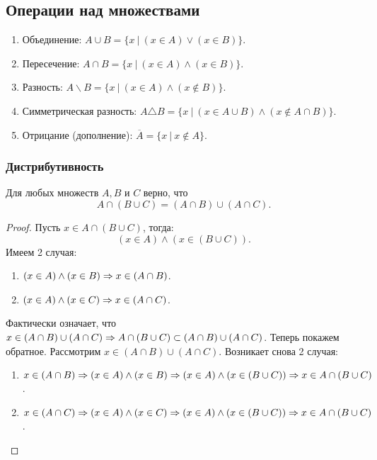 \begin{multicols}{2}
    \subsection*{Операции над множествами}
     
    \begin{enumerate}
         \item Объединение: $A \cup B = \{x\ |\ (x \in A) \vee (x \in B)\}$.
         \item Пересечение: $A \cap B = \{x\ |\ (x \in A) \wedge (x \in B)\}$.
         \item Разность: $A \backslash B = \{x\ |\ (x \in A) \wedge (x \notin B)\}$.
         \item Симметрическая разность: $A \triangle B = \{x\ |\ (x \in A \cup B) \wedge (x \notin A \cap B)\}$.
         \item Отрицание (дополнение): $\overline{A} = \{x\ |\ x \notin A\}$.
    \end{enumerate}
    
    \subsubsection*{Дистрибутивность}
    
    \begin{proposition}{}{}
      Для любых множеств $A, B$ и $C$ верно, что
      $$
        A \cap (B \cup C) = (A \cap B) \cup (A \cap C).
      $$
    \end{proposition}
    
    \begin{proof}
      Пусть $x \in A \cap (B \cup C)$, тогда:
      $$
      (x \in A) \wedge (x \in (B \cup C)).
      $$
      Имеем 2 случая:
      \begin{enumerate}
        \item $(x \in A) \wedge (x \in B) \Rightarrow x \in (A \cap B)$.
        \item $(x \in A) \wedge (x \in C) \Rightarrow x \in (A \cap C)$.
      \end{enumerate}
      Фактически означает, что $x \in (A \cap B) \cup (A \cap C) \Rightarrow A \cap (B \cup C) \subset (A \cap B) \cup (A \cap C)$.
      Теперь покажем обратное. Рассмотрим $x \in (A \cap B) \cup (A \cap C)$.
      Возникает снова 2 случая:
      \begin{enumerate}
        \item $x \in (A \cap B) \Rightarrow (x \in A) \wedge (x \in B) \Rightarrow (x \in A) \wedge (x \in (B \cup C)) \Rightarrow x \in A \cap (B \cup C)$.
        \item $x \in (A \cap C) \Rightarrow (x \in A) \wedge (x \in C) \Rightarrow (x \in A) \wedge (x \in (B \cup C)) \Rightarrow x \in A \cap (B \cup C)$.
      \end{enumerate}
    

\end{proof}
\end{multicols}
